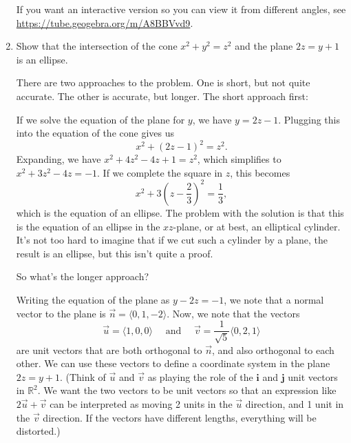 \documentclass[letterpaper,12pt]{article}
\newcommand{\R}{\mathbb{R}}
\renewcommand{\i}{\mathbf{i}}
\renewcommand{\j}{\mathbf{j}}
\begin{document}
\begin{enumerate}
If you want an interactive version so you can view it from different angles, see\\
 \href{https://tube.geogebra.org/m/A8BBVvd9}{https://tube.geogebra.org/m/A8BBVvd9}.

 \item Show that the intersection of the cone $x^2+y^2=z^2$ and the plane $2z=y+1$ is an ellipse.

\bigskip

There are two approaches to the problem. One is short, but not quite accurate. The other is accurate, but longer. The short approach first:

\medskip

If we solve the equation of the plane for $y$, we have $y=2z-1$. Plugging this into the equation of the cone gives us
\[
 x^2+(2z-1)^2=z^2.
\]
Expanding, we have $x^2+4z^2-4z+1=z^2$, which simplifies to $x^2+3z^2-4z=-1$. If we complete the square in $z$, this becomes
\[
 x^2+3\left(z-\frac{2}{3}\right)^2=\frac{1}{3},
\]
which is the equation of an ellipse. The problem with the solution is that this is the equation of an ellipse in the $xz$-plane, or at best, an elliptical cylinder. It's not too hard to imagine that if we cut such a cylinder by a plane, the result is an ellipse, but this isn't quite a proof.

So what's the longer approach?

\medskip

Writing the equation of the plane as $y-2z=-1$, we note that a normal vector to the plane is $\vec{n}=\langle 0,1,-2\rangle$. Now, we note that the vectors
\[
\vec{u} = \langle 1,0,0\rangle \quad \text{ and } \quad \vec{v} = \frac{1}{\sqrt{5}}\langle 0,2,1\rangle
\]
are unit vectors that are both orthogonal to $\vec{n}$, and also orthogonal to each other. We can use these vectors to define a coordinate system in the plane $2z=y+1$. (Think of $\vec{u}$ and $\vec{v}$ as playing the role of the $\i$ and $\j$ unit vectors in $\R^2$. We want the two vectors to be unit vectors so that an expression like $2\vec{u}+\vec{v}$ can be interpreted as moving 2 units in the $\vec{u}$ direction, and 1 unit in the $\vec{v}$ direction. If the vectors have different lengths, everything will be distorted.)


\end{enumerate}
\end{document}

